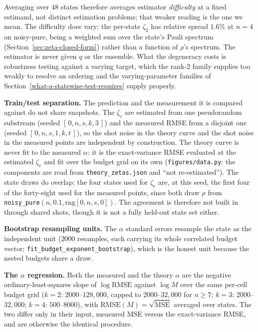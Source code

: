 \documentclass[a4paper,superscriptaddress,nofootinbib,onecolumn,nopdfoutputerror]{quantumarticle}
\begin{document}
Averaging over \(48\) states therefore averages estimator
\emph{difficulty} at a fixed estimand, not distinct estimation problems;
that weaker reading is the one we mean. The difficulty does
vary: the per-state \(\zeta_2\) has relative spread \(1.6\%\) at
\(n = 4\) on noisy-pure, being a weighted sum over the state's Pauli
spectrum (Section~\ref{sec:zeta-closed-form}) rather than a function of
\(\rho\)'s spectrum. The estimator is never given \(q\) or the ensemble. What
the degeneracy costs is robustness testing against a varying target, which the
rank-2 family supplies too weakly to resolve an ordering and the varying-parameter
families of Section~\ref{what-a-statewise-test-requires} supply properly.

\textbf{Train/test separation.} The prediction and the measurement it is
compared against do not share snapshots. The \(\zeta_c\) are estimated from
one pseudorandom substream (seeded \([\,0, n, s, k, 3\,]\)) and the measured
RMSE from a disjoint one (seeded \([\,0, n, s, 1, k, t\,]\)), so the shot
noise in the theory curve and the shot noise in the measured points are
independent by construction. The theory curve is never fit to the measured
\(\alpha\): it is the exact-variance RMSE evaluated at the estimated
\(\zeta_c\) and fit over the budget grid on its own
(\texttt{figures/data.py}: the components are read from
\texttt{theory\_zetas.json} and ``not re-estimated''). The state draws do
overlap: the four states used for \(\zeta_c\) are, at this seed, the first
four of the forty-eight used for the measured points, since both draw
\(\rho\) from \texttt{noisy\_pure}\((n, 0.1, \mathrm{rng}[0, n, s, 0])\).
The agreement is therefore not built in through shared shots, though it is
not a fully held-out state set either.

\textbf{Bootstrap resampling units.} The \(\alpha\) standard errors resample
the state as the independent unit (\(2000\) resamples, each carrying its
whole correlated budget vector; \texttt{fit\_\allowbreak budget\_\allowbreak exponent\_\allowbreak bootstrap}),
which is the honest unit because the nested budgets share a draw.

\textbf{The \(\alpha\) regression.} Both the measured and the theory
\(\alpha\) are the negative ordinary-least-squares slope of
\(\log \mathrm{RMSE}\) against \(\log M\) over the same per-cell budget grid
(\(k = 2\): \(2000\)--\(128{,}000\), capped to \(2000\)--\(32{,}000\) for
\(n \ge 7\); \(k = 3\): \(2000\)--\(32{,}000\); \(k = 4\):
\(500\)--\(8000\)), with \(\mathrm{RMSE}(M) = \sqrt{\overline{\mathrm{MSE}}}\)
averaged over states. The two differ only in their input, measured MSE
versus the exact-variance RMSE, and are otherwise the identical
procedure.
\end{document}
